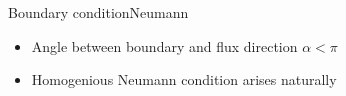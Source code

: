 %
%
%
%
%

\begin{frame}{Boundary condition}{Neumann}
  \begin{itemize}
  \item Angle between boundary and flux direction $\alpha<\pi$
  \item Homogenious Neumann condition arises naturally
  \end{itemize}
  \vfill
  \centering
  
\end{frame}

